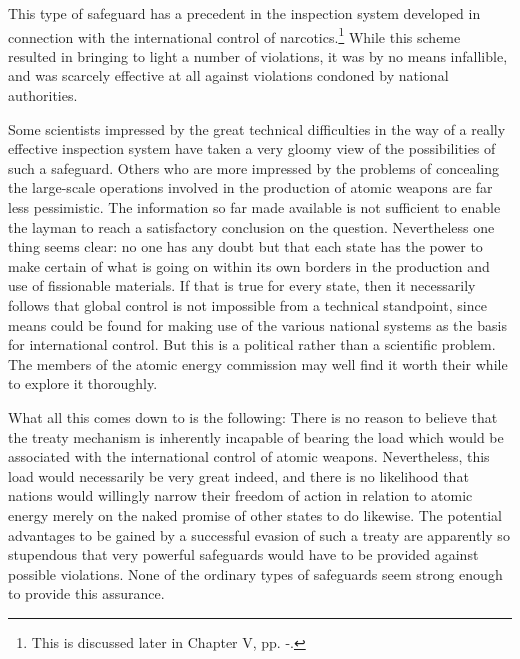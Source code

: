 \begin{introduction}
This type of safeguard has a precedent in the inspection system developed in connection with the international control of narcotics.\footnote{This is discussed later in Chapter V, pp. \pageref{V-narco1}-\pageref{V-narco2}.} While this scheme resulted in bringing to light a number of violations, it was by no means infallible, and was scarcely effective at all against violations condoned by national authorities.

Some scientists impressed by the great technical difficulties in the way of a really effective inspection system have taken a very gloomy view of the possibilities of such a safeguard. Others who are more impressed by the problems of concealing the large-scale operations involved in the production of atomic weapons are far less pessimistic. The information so far made available is not sufficient to enable the layman to reach a satisfactory conclusion on the question. Nevertheless one thing seems clear: no one has any doubt but that each state has the power to make certain of what is going on within its own borders in the production and use of fissionable materials. If that is true for every state, then it necessarily follows that global control is not impossible from a technical standpoint, since means could be found for making use of the various national systems as the basis for international control. But this is a political rather than a scientific problem. The members of the atomic energy commission may well find it worth their while to explore it thoroughly.

What all this comes down to is the following: There is no reason to believe that the treaty mechanism is inherently incapable of bearing the load which would be associated with the international control of atomic weapons. Nevertheless, this load would necessarily be very great indeed, and there is no likelihood that nations would willingly narrow their freedom of action in relation to atomic energy merely on the naked promise of other states to do likewise. The potential advantages to be gained by a successful evasion of such a treaty are apparently so stupendous that very powerful safeguards would have to be provided against possible violations. None of the ordinary types of safeguards seem strong enough to provide this assurance.


\end{introduction}
